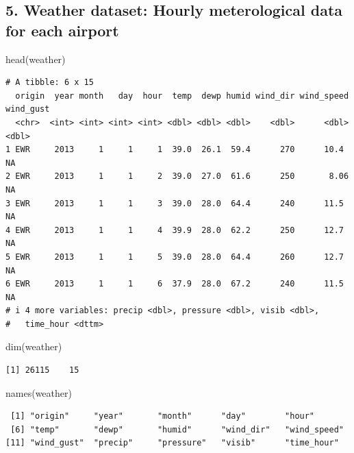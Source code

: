 \documentclass[
  10pt,
  letterpaper,
  DIV=11,
  numbers=noendperiod]{scrartcl}
\newenvironment{Shaded}{\begin{snugshade}}{\end{snugshade}}
\newcommand{\FunctionTok}[1]{\textcolor[rgb]{0.28,0.35,0.67}{#1}}
\newcommand{\NormalTok}[1]{\textcolor[rgb]{0.00,0.23,0.31}{#1}}
\begin{document}
\subsection{5. Weather dataset: Hourly meterological data for each
airport}\label{weather-dataset-hourly-meterological-data-for-each-airport}

\begin{Shaded}
\begin{Highlighting}[numbers=left,,]
\FunctionTok{head}\NormalTok{(weather)}
\end{Highlighting}
\end{Shaded}

\begin{verbatim}
# A tibble: 6 x 15
  origin  year month   day  hour  temp  dewp humid wind_dir wind_speed wind_gust
  <chr>  <int> <int> <int> <int> <dbl> <dbl> <dbl>    <dbl>      <dbl>     <dbl>
1 EWR     2013     1     1     1  39.0  26.1  59.4      270      10.4         NA
2 EWR     2013     1     1     2  39.0  27.0  61.6      250       8.06        NA
3 EWR     2013     1     1     3  39.0  28.0  64.4      240      11.5         NA
4 EWR     2013     1     1     4  39.9  28.0  62.2      250      12.7         NA
5 EWR     2013     1     1     5  39.0  28.0  64.4      260      12.7         NA
6 EWR     2013     1     1     6  37.9  28.0  67.2      240      11.5         NA
# i 4 more variables: precip <dbl>, pressure <dbl>, visib <dbl>,
#   time_hour <dttm>
\end{verbatim}

\begin{Shaded}
\begin{Highlighting}[numbers=left,,]
\FunctionTok{dim}\NormalTok{(weather)}
\end{Highlighting}
\end{Shaded}

\begin{verbatim}
[1] 26115    15
\end{verbatim}

\begin{Shaded}
\begin{Highlighting}[numbers=left,,]
\FunctionTok{names}\NormalTok{(weather)}
\end{Highlighting}
\end{Shaded}

\begin{verbatim}
 [1] "origin"     "year"       "month"      "day"        "hour"      
 [6] "temp"       "dewp"       "humid"      "wind_dir"   "wind_speed"
[11] "wind_gust"  "precip"     "pressure"   "visib"      "time_hour" 
\end{verbatim}
\end{document}
